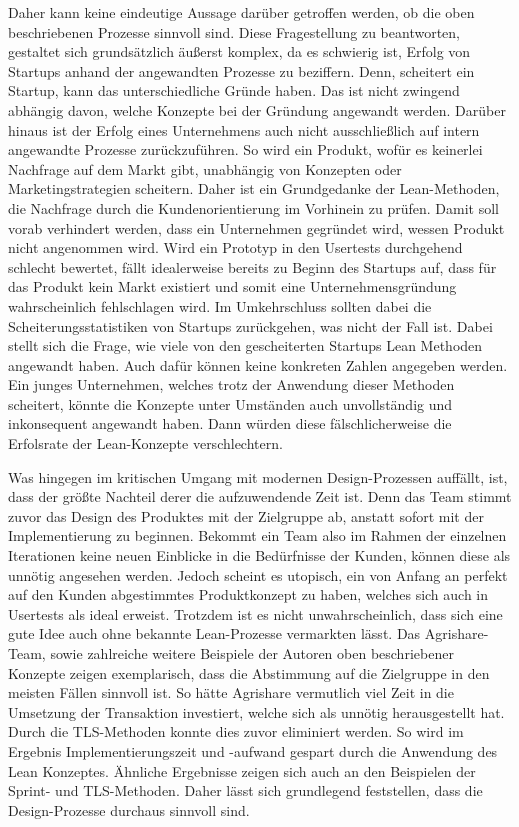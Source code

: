 Daher kann keine eindeutige Aussage darüber getroffen werden, ob die oben beschriebenen Prozesse sinnvoll sind. Diese Fragestellung zu beantworten, gestaltet sich grundsätzlich äußerst komplex, da es schwierig ist, Erfolg von Startups anhand der angewandten Prozesse zu beziffern. Denn, scheitert ein Startup, kann das unterschiedliche Gründe haben. Das ist nicht zwingend abhängig davon, welche Konzepte bei der Gründung angewandt werden. Darüber hinaus ist der Erfolg eines Unternehmens auch nicht ausschließlich auf intern angewandte Prozesse zurückzuführen. So wird ein Produkt, wofür es keinerlei Nachfrage auf dem Markt gibt, unabhängig von Konzepten oder Marketingstrategien scheitern. Daher ist ein Grundgedanke der Lean-Methoden, die Nachfrage durch die Kundenorientierung im Vorhinein zu prüfen. Damit soll vorab verhindert werden, dass ein Unternehmen gegründet wird, wessen Produkt nicht angenommen wird. Wird ein Prototyp in den Usertests durchgehend schlecht bewertet, fällt idealerweise bereits zu Beginn des Startups auf, dass für das Produkt kein Markt existiert und somit eine Unternehmensgründung wahrscheinlich fehlschlagen wird. Im Umkehrschluss sollten dabei die Scheiterungsstatistiken von Startups zurückgehen, was nicht der Fall ist. Dabei stellt sich die Frage, wie viele von den gescheiterten Startups Lean Methoden angewandt haben. Auch dafür können keine konkreten Zahlen angegeben werden. Ein junges Unternehmen, welches trotz der Anwendung dieser Methoden scheitert, könnte die Konzepte unter Umständen auch unvollständig und inkonsequent angewandt haben. Dann würden diese fälschlicherweise die Erfolsrate der Lean-Konzepte verschlechtern. 

Was hingegen im kritischen Umgang mit modernen Design-Prozessen auffällt, ist, dass der größte Nachteil derer die aufzuwendende Zeit ist. Denn das Team stimmt zuvor das Design des Produktes mit der Zielgruppe ab, anstatt sofort mit der Implementierung zu beginnen. Bekommt ein Team also im Rahmen der einzelnen Iterationen keine neuen Einblicke in die Bedürfnisse der Kunden, können diese als unnötig angesehen werden. Jedoch scheint es utopisch, ein von Anfang an perfekt auf den Kunden abgestimmtes Produktkonzept zu haben, welches sich auch in Usertests als ideal erweist. Trotzdem ist es nicht unwahrscheinlich, dass sich eine gute Idee auch ohne bekannte Lean-Prozesse vermarkten lässt. Das Agrishare-Team, sowie zahlreiche weitere Beispiele der Autoren oben beschriebener Konzepte zeigen exemplarisch, dass die Abstimmung auf die Zielgruppe in den meisten Fällen sinnvoll ist. So hätte Agrishare vermutlich viel Zeit in die Umsetzung der Transaktion investiert, welche sich als unnötig herausgestellt hat. Durch die \ac{TLS}-Methoden konnte dies zuvor eliminiert werden. So wird im Ergebnis Implementierungszeit und -aufwand gespart durch die Anwendung des Lean Konzeptes. Ähnliche Ergebnisse zeigen sich auch an den Beispielen der Sprint- und \ac{TLS}-Methoden. Daher lässt sich grundlegend feststellen, dass die Design-Prozesse durchaus sinnvoll sind.

